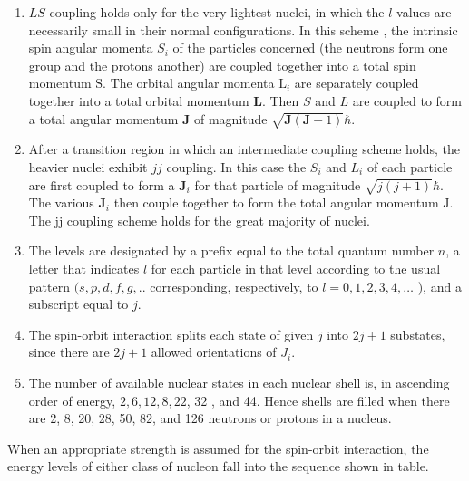 \begin{enumerate}
	\item  $L S$ coupling holds only for the very lightest nuclei, in which the $l$ values are necessarily small in their normal configurations. In this scheme , the intrinsic spin angular momenta $S_{i}$ of the particles concerned (the neutrons form one group and the protons another) are coupled together into a total spin momentum $\mathrm{S}$. The orbital angular momenta $\mathrm{L}_{i}$ are separately coupled together into a total orbital momentum $\mathbf{L}$. Then $S$ and $L$ are coupled to form a total angular momentum $\mathbf{J}$ of magnitude $\sqrt{\mathbf{J}(\mathbf{J}+1)} \hbar$.
	\item After a transition region in which an intermediate coupling scheme holds, the heavier nuclei exhibit $j j$ coupling. In this case the $S_{i}$ and $L_{i}$ of each particle are first coupled to form a $\mathbf{J}_{i}$ for that particle of magnitude $\sqrt{j(j+1)} \hbar$. The various $\mathbf{J}_{i}$ then couple together to form the total angular momentum $\mathrm{J}$. The $\mathrm{jj}$ coupling scheme holds for the great majority of nuclei.
	\item The levels are designated by a prefix equal to the total quantum number $n$, a letter that indicates $l$ for each particle in that level according to the usual pattern $(s, p, d, f, g, . .$ corresponding, respectively, to $l=0,1,2,3,4, \ldots$ ), and a subscript equal to $j$.
	\item The spin-orbit interaction splits each state of given $j$ into $2 j+1$ substates, since there are $2 j+1$ allowed orientations of $J_{i}$.
	\item The number of available nuclear states in each nuclear shell is, in ascending order of energy, $2,6,12,8,22$, 32 , and 44. Hence shells are filled when there are 2, 8, 20, 28, 50, 82, and 126 neutrons or protons in a nucleus.
\end{enumerate}
When an appropriate strength is assumed for the spin-orbit interaction, the energy levels of either class of nucleon fall into the sequence shown in table.
